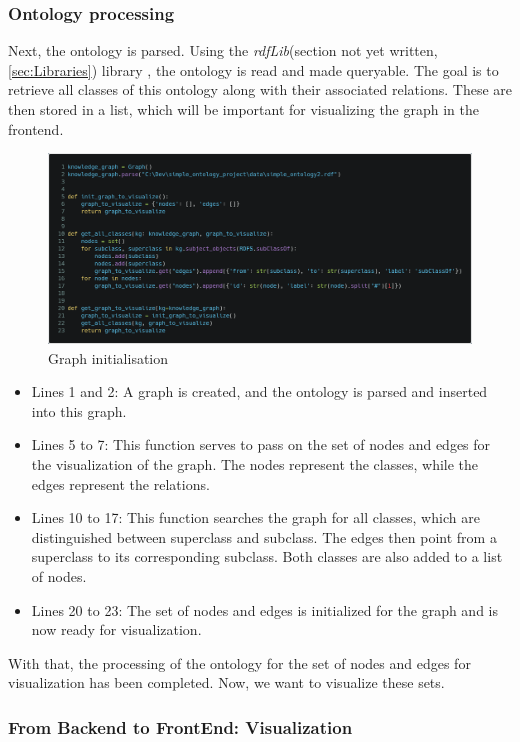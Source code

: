 \subsubsection*{Ontology processing}
Next, the ontology is parsed. Using the \textit{rdfLib}(section not yet written, 
\ref{sec:Libraries}) library , the ontology is read and made queryable. The goal is to retrieve all classes of this ontology along with their associated relations. 
These are then stored in a list, which will be important for visualizing the graph in the frontend.
\begin{figure}[H]
    \includegraphics[scale=0.2]{Graphics/simple_ontology_graph_init.png}
    \caption{Graph initialisation}
    \end{figure}
    
\begin{itemize}
    \item Lines 1 and 2: A graph is created, and the ontology is parsed and inserted into this graph.
    \item Lines 5 to 7: This function serves to pass on the set of nodes and edges for the visualization of the graph. The nodes represent the classes, while the edges represent the relations.
    \item Lines 10 to 17: This function searches the graph for all classes, which are distinguished between superclass and subclass. The edges then point from a superclass to its corresponding subclass. Both classes are also added to a list of nodes.
    \item Lines 20 to 23: The set of nodes and edges is initialized for the graph and is now ready for visualization.
\end{itemize}

With that, the processing of the ontology for the set of nodes and edges for visualization has been completed. Now, we want to visualize these sets.

\subsubsection*{From Backend to FrontEnd: Visualization}


